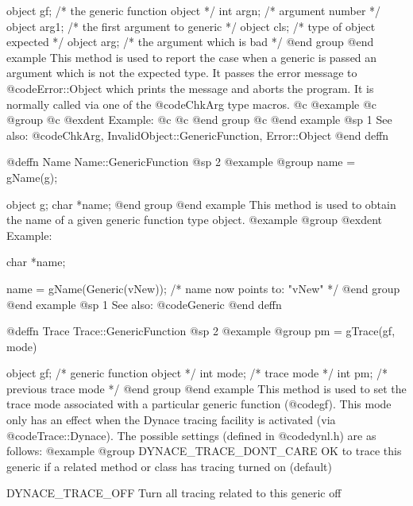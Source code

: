 object  gf;     /*  the generic function object    */
int     argn;   /*  argument number            */
object  arg1;   /*  the first argument to generic  */
object  cls;    /*  type of object expected    */
object  arg;    /*  the argument which is bad  */
@end group
@end example
This method is used to report the case when a generic is passed an
argument which is not the expected type.  It passes the error message to
@code{Error::Object} which prints the message and aborts the program.
It is normally called via one of the @code{ChkArg} type macros.
@c @example
@c @group
@c @exdent Example:
@c 
@c @end group
@c @end example
@sp 1
See also:  @code{ChkArg, InvalidObject::GenericFunction, Error::Object}
@end deffn










@deffn {Name} Name::GenericFunction
@sp 2
@example
@group
name = gName(g);

object  g;
char    *name;
@end group
@end example
This method is used to obtain the name of a given generic function type object.
@example
@group
@exdent Example:

char    *name;

name = gName(Generic(vNew));
/*  name now points to:   "vNew"  */
@end group
@end example
@sp 1
See also:  @code{Generic}
@end deffn













@deffn {Trace} Trace::GenericFunction
@sp 2
@example
@group
pm = gTrace(gf, mode)

object  gf;     /*  generic function object */
int     mode;   /*  trace mode              */
int     pm;     /*  previous trace mode     */
@end group
@end example
This method is used to set the trace mode associated with a
particular generic function (@code{gf}).  This mode only has an effect
when the Dynace tracing facility is activated (via
@code{Trace::Dynace}).  The possible settings (defined in
@code{dynl.h}) are as follows:
@example
@group
DYNACE_TRACE_DONT_CARE   OK to trace this generic if a
                         related method or class has tracing
                         turned on (default)

DYNACE_TRACE_OFF         Turn all tracing related to this
                         generic off

